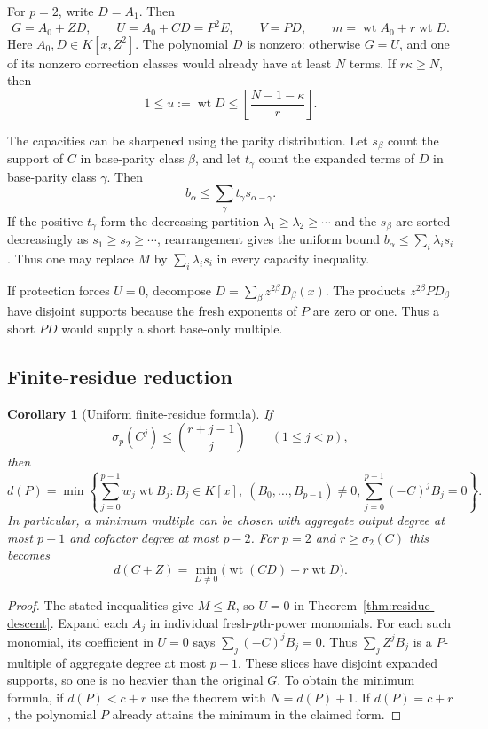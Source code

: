 \documentclass[11pt]{article}
\DeclareMathOperator{\wt}{wt}\DeclareMathOperator{\ord}{ord}
\numberwithin{equation}{section}
\newtheorem{corollary}[theorem]{Corollary}
\theoremstyle{definition}\newtheorem{definition}[theorem]{Definition}
\theoremstyle{remark}\newtheorem{remark}[theorem]{Remark}
\begin{document}
For $p=2$, write $D=A_1$. Then
\begin{equation}\label{eq:binary-residue-form}
 G=A_0+ZD,\qquad U=A_0+CD=P^2E,\qquad V=PD,
 \qquad m=\wt A_0+r\wt D.
\end{equation}
Here $A_0,D\in K[x,Z^2]$. The polynomial $D$ is nonzero: otherwise
$G=U$, and one of its nonzero correction classes would already
have at least $N$ terms. If $r\kappa\ge N$, then
\begin{equation}\label{eq:binary-u-budget}
 1\le u:=\wt D\le\left\lfloor\frac{N-1-\kappa}{r}\right\rfloor.
\end{equation}

The capacities can be sharpened using the parity distribution. Let
$s_\beta$ count the support of $C$ in base-parity class $\beta$,
and let $t_\gamma$ count the expanded terms of $D$ in base-parity
class $\gamma$. Then
\[
 b_\alpha\le\sum_\gamma t_\gamma s_{\alpha-\gamma}.
\]
If the positive $t_\gamma$ form the decreasing partition
$\lambda_1\ge\lambda_2\ge\cdots$ and the $s_\beta$ are sorted
decreasingly as $s_1\ge s_2\ge\cdots$, rearrangement gives the
uniform bound $b_\alpha\le\sum_i\lambda_i s_i$. Thus one may replace
$M$ by $\sum_i\lambda_i s_i$ in every capacity inequality.

If protection forces $U=0$, decompose
$D=\sum_\beta z^{2\beta}D_\beta(x)$. The products
$z^{2\beta}PD_\beta$ have disjoint supports because the fresh
exponents of $P$ are zero or one. Thus a short $PD$ would supply a
short base-only multiple.

\subsection{Finite-residue reduction}

\begin{corollary}[Uniform finite-residue formula]\label{cor:finite-residue}
If
\[
 \sigma_p(C^j)\le\binom{r+j-1}{j}\qquad(1\le j<p),
\]
then
\[
 d(P)=\min\left\{\sum_{j=0}^{p-1}w_j\wt B_j:
  B_j\in K[x],\ (B_0,\ldots,B_{p-1})\ne0,
  \sum_{j=0}^{p-1}(-C)^jB_j=0\right\}.
\]
In particular, a minimum multiple can be chosen with aggregate output
degree at most $p-1$ and cofactor degree at most $p-2$.
For $p=2$ and $r\ge\sigma_2(C)$ this becomes
\[
 d(C+Z)=\min_{D\ne0}\bigl(\wt(CD)+r\wt D\bigr).
\]
\end{corollary}
\begin{proof}
The stated inequalities give $M\le R$, so $U=0$ in
Theorem~\ref{thm:residue-descent}. Expand each $A_j$ in individual
fresh-$p$th-power monomials. For each such monomial, its coefficient
in $U=0$ says $\sum_j(-C)^jB_j=0$. Thus
$\sum_jZ^jB_j$ is a $P$-multiple of aggregate degree at most $p-1$.
These slices have disjoint expanded supports, so one is no heavier
than the original $G$. To obtain the minimum formula, if
$d(P)<c+r$ use the theorem with $N=d(P)+1$. If $d(P)=c+r$, the
polynomial $P$ already attains the minimum in the claimed form.
\end{proof}
\end{document}
